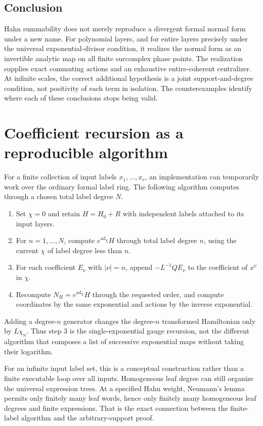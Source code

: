 \documentclass[11pt,letterpaper]{article}
\numberwithin{equation}{section}
\theoremstyle{definition}
\theoremstyle{remark}
\newcommand{\ad}{\operatorname{ad}}
\begin{document}
\subsection{Conclusion}
Hahn summability does not merely reproduce a divergent formal normal form
under a new name. For polynomial layers, and for entire layers precisely
under the universal exponential-divisor condition, it realizes the normal
form as an invertible analytic map on all finite surcomplex phase points.
The realization supplies exact commuting actions and an exhaustive
entire-coherent centralizer. At infinite scales, the correct additional
hypothesis is a joint support-and-degree condition, not positivity of each
term in isolation. The counterexamples identify where each of these
conclusions stops being valid.

\appendix
\section{Coefficient recursion as a reproducible algorithm}
\label{app:algorithm}
For a finite collection of input labels $x_1,\ldots,x_r$, an implementation
can temporarily work over the ordinary formal label ring. The following
algorithm computes through a chosen total label degree $N$.
\begin{enumerate}[label=\arabic*.]
\item Set $\chi=0$ and retain $H=H_0+R$ with independent labels attached to
its input layers.
\item For $n=1,\ldots,N$, compute $e^{\ad_\chi}H$ through total label degree
$n$, using the current $\chi$ of label degree less than $n$.
\item For each coefficient $E_\nu$ with $|\nu|=n$, append
$-L^{-1}QE_\nu$ to the coefficient of $x^\nu$ in $\chi$.
\item Recompute $N_H=e^{\ad_\chi}H$ through the requested order, and compute
coordinates by the same exponential and actions by the inverse exponential.
\end{enumerate}
Adding a degree-$n$ generator changes the degree-$n$ transformed Hamiltonian
only by $L\chi_n$. Thus step 3 is the single-exponential gauge recursion,
not the different algorithm that composes a list of successive exponential
maps without taking their logarithm.

For an infinite input label set, this is a conceptual construction rather
than a finite executable loop over all inputs. Homogeneous leaf degree can
still organize the universal expression trees. At a specified Hahn weight,
Neumann's lemma permits only finitely many leaf words, hence only finitely
many homogeneous leaf degrees and finite expressions. That is the exact
connection between the finite-label algorithm and the arbitrary-support
proof.
\end{document}

